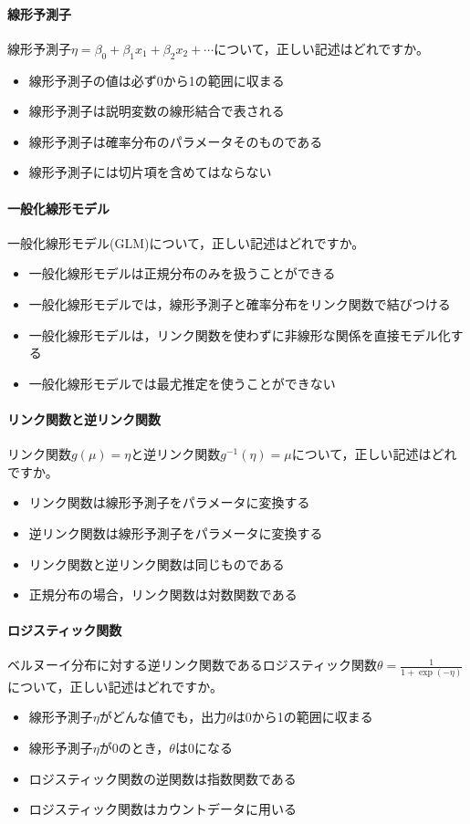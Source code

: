 \documentclass{ltjbook}
\begin{document}
\paragraph{線形予測子}
線形予測子$\eta = \beta_0 + \beta_1 x_1 + \beta_2 x_2 + \cdots$について，正しい記述はどれですか。
\begin{itemize}
	\item 線形予測子の値は必ず0から1の範囲に収まる
	\item 線形予測子は説明変数の線形結合で表される
	\item 線形予測子は確率分布のパラメータそのものである
	\item 線形予測子には切片項を含めてはならない
\end{itemize}

\paragraph{一般化線形モデル}
一般化線形モデル(GLM)について，正しい記述はどれですか。
\begin{itemize}
	\item 一般化線形モデルは正規分布のみを扱うことができる
	\item 一般化線形モデルでは，線形予測子と確率分布をリンク関数で結びつける
	\item 一般化線形モデルは，リンク関数を使わずに非線形な関係を直接モデル化する
	\item 一般化線形モデルでは最尤推定を使うことができない
\end{itemize}

\paragraph{リンク関数と逆リンク関数}
リンク関数$g(\mu) = \eta$と逆リンク関数$g^{-1}(\eta) = \mu$について，正しい記述はどれですか。
\begin{itemize}
	\item リンク関数は線形予測子をパラメータに変換する
	\item 逆リンク関数は線形予測子をパラメータに変換する
	\item リンク関数と逆リンク関数は同じものである
	\item 正規分布の場合，リンク関数は対数関数である
\end{itemize}

\paragraph{ロジスティック関数}
ベルヌーイ分布に対する逆リンク関数であるロジスティック関数$\theta = \frac{1}{1+\exp(-\eta)}$について，正しい記述はどれですか。
\begin{itemize}
	\item 線形予測子$\eta$がどんな値でも，出力$\theta$は0から1の範囲に収まる
	\item 線形予測子$\eta$が0のとき，$\theta$は0になる
	\item ロジスティック関数の逆関数は指数関数である
	\item ロジスティック関数はカウントデータに用いる
\end{itemize}
\end{document}
